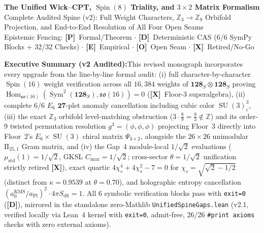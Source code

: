 \documentclass[11pt,a4paper]{article}
\newcommand{\badgeP}{\textbf{\color{sqJade}[P]}}
\newcommand{\badgeD}{\textbf{\color{sqRose}[D]}}
\newcommand{\badgeE}{\textbf{\color{sqIce}[E]}}
\newcommand{\badgeO}{\textbf{\color{sqAmber}[O]}}
\newcommand{\badgeX}{\textbf{\color{sqKilled}[X]}}
\theoremstyle{definition}
\newcommand{\callout}[2]{%
  \vspace{5pt}\noindent\colorbox{sqBg}{%
    \parbox{\dimexpr\linewidth-2\fboxsep\relax}{%
      \vspace{4pt}\textbf{\color{sqPrimary}#1:}\hspace{0.4em}#2\vspace{4pt}%
    }%
  }\vspace{5pt}%
}
\begin{document}
\begin{center}
  {\LARGE\bfseries\color{sqPrimary} The Unified Wick--CPT, $\operatorname{Spin}(8)$ Triality, and $3\times 2$ Matrix Formalism}\\[6pt]
  {\large\color{sqMuted} Complete Audited Spine (v2): Full Weight Characters, $\mathbb{Z}_3\to\mathbb{Z}_9$ Orbifold Projection, and End-to-End Resolution of All Four Open Seams}\\[8pt]
  {\small\color{sqMuted} Epistemic Fencing: \badgeP\ Formal/Theorem \quad $\cdot$ \quad \badgeD\ Deterministic CAS (6/6 SymPy Blocks + 32/32 Checks) \quad $\cdot$ \quad \badgeE\ Empirical \quad $\cdot$ \quad \badgeO\ Open Seam \quad $\cdot$ \quad \badgeX\ Retired/No-Go}
\end{center}

\vspace{4pt}
\callout{Executive Summary (v2 Audited)}{This revised monograph incorporates every upgrade from the line-by-line formal audit: (i) full character-by-character $\operatorname{Spin}(16)$ weight verification across all $16{,}384$ weights of $\mathbf{128}_S\otimes\mathbf{128}_S$ proving $\operatorname{Hom}_{\mathfrak{so}(16)}(\operatorname{Sym}^2(\mathbf{128}_S),\mathfrak{so}(16))=0$ (\badgeX\ Floor-3 superalgebra), (ii) complete 6/6 $E_6$ $\mathbf{27}$-plet anomaly cancellation including cubic color $\operatorname{SU}(3)_c^3$, (iii) the exact $\mathbb{Z}_3$ orbifold level-matching obstruction ($3\cdot\frac{8}{9} = \frac{8}{3}\notin\mathbb{Z}$) and its order-9 twisted permutation resolution $g^3 = (\phi,\phi,\phi)$ projecting Floor~3 directly into Floor~2's $E_6\times\operatorname{SU}(3)$ chiral matrix $\Psi_{3\times 2}$, alongside the $26\times 26$ unimodular $\mathrm{II}_{25,1}$ Gram matrix, and (iv) the Gap~4 module-local $1/\sqrt{2}$ evaluations ($\mu_{\mathrm{std}}(1) = 1/\sqrt{2}$, GKSL $C_{\max} = 1/\sqrt{2}$; cross-sector $\theta = 1/\sqrt{2}$ unification strictly retired \badgeX), exact quartic $4\chi_s^4 + 4\chi_s^2 - 7 = 0$ for $\chi_s = \sqrt{\sqrt{2} - 1/2}$ (distinct from $\kappa = 0.9539$ at $\theta = 0.70$), and holographic entropy cancellation $(a_0^{\mathrm{KMS}}/a_{\mathrm{Pl}})^2\cdot 4\pi S_{\mathrm{dS}} = 1$. All 6 symbolic verification blocks pass with \texttt{exit=0} (\badgeD), mirrored in the standalone zero-Mathlib \texttt{UnifiedSpineGaps.lean} (v2.1, verified locally via Lean~4 kernel with \texttt{exit=0}, admit-free, 26/26 \texttt{\#print axioms} checks with zero external axioms).}

\tableofcontents
\vspace{6pt}
\end{document}

